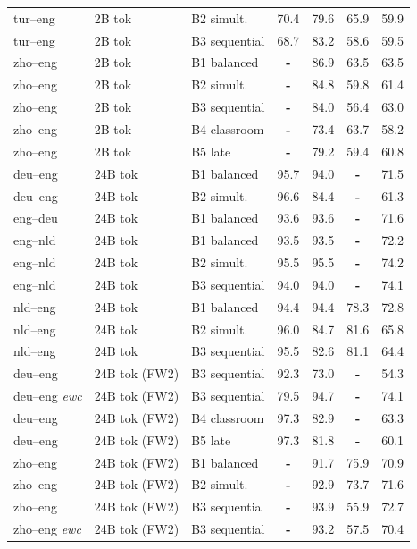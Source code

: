 \begin{table}[t]
\begin{tabular}{lll cc cc}
tur--eng  & 2B tok & B2 simult. & 70.4 & 79.6 & 65.9 & 59.9 \\
tur--eng  & 2B tok & B3 sequential & 68.7 & 83.2 & 58.6 & 59.5 \\
zho--eng & 2B tok & B1 balanced & \textbf{-} & 86.9 & 63.5 & 63.5 \\
zho--eng & 2B tok & B2 simult. & \textbf{-} & 84.8 & 59.8 & 61.4 \\
zho--eng & 2B tok & B3 sequential & \textbf{-} & 84.0 & 56.4 & 63.0 \\
zho--eng & 2B tok & B4 classroom & \textbf{-} & 73.4 & 63.7 & 58.2 \\
zho--eng & 2B tok & B5 late & \textbf{-} & 79.2 & 59.4 & 60.8 \\
\midrule
deu--eng & 24B tok & B1 balanced & 95.7 & 94.0 & \textbf{-} & 71.5 \\
deu--eng & 24B tok & B2 simult. & 96.6 & 84.4 & \textbf{-} & 61.3 \\
eng--deu & 24B tok & B1 balanced & 93.6 & 93.6 & \textbf{-} & 71.6 \\
eng--nld & 24B tok & B1 balanced & 93.5 & 93.5 & \textbf{-} & 72.2 \\
eng--nld & 24B tok & B2 simult. & 95.5 & 95.5 & \textbf{-} & 74.2 \\
eng--nld & 24B tok & B3 sequential & 94.0 & 94.0 & \textbf{-} & 74.1 \\
nld--eng & 24B tok & B1 balanced & 94.4 & 94.4 & 78.3 & 72.8 \\
nld--eng & 24B tok & B2 simult. & 96.0 & 84.7 & 81.6 & 65.8 \\
nld--eng & 24B tok & B3 sequential & 95.5 & 82.6 & 81.1 & 64.4 \\
\midrule
deu--eng & 24B tok (FW2) & B3 sequential & 92.3 & 73.0 & \textbf{-} & 54.3 \\
deu--eng {\scriptsize\textit{ewc}} & 24B tok (FW2) & B3 sequential & 79.5 & 94.7 & \textbf{-} & 74.1 \\
deu--eng & 24B tok (FW2) & B4 classroom & 97.3 & 82.9 & \textbf{-} & 63.3 \\
deu--eng & 24B tok (FW2) & B5 late & 97.3 & 81.8 & \textbf{-} & 60.1 \\
zho--eng & 24B tok (FW2) & B1 balanced & \textbf{-} & 91.7 & 75.9 & 70.9 \\
zho--eng & 24B tok (FW2) & B2 simult. & \textbf{-} & 92.9 & 73.7 & 71.6 \\
zho--eng & 24B tok (FW2) & B3 sequential & \textbf{-} & 93.9 & 55.9 & 72.7 \\
zho--eng {\scriptsize\textit{ewc}} & 24B tok (FW2) & B3 sequential & \textbf{-} & 93.2 & 57.5 & 70.4 \\

\end{tabular}
\end{table}
